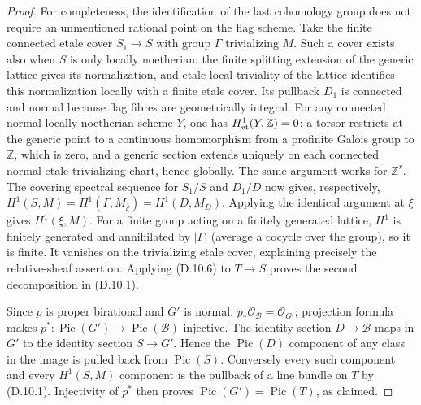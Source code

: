 \begin{proof}
For completeness, the identification of the last cohomology group
does not require an unmentioned rational point on the flag scheme.
Take the finite connected etale cover $S_1\to S$ with group
$\Gamma$ trivializing $M$.  Such a cover exists also when $S$
is only locally noetherian: the finite splitting extension of the
generic lattice gives its normalization, and etale local
triviality of the lattice identifies this normalization locally
with a finite etale cover.  Its pullback $D_1$ is connected and
normal because flag fibres are geometrically integral.  For any
connected normal locally noetherian scheme $Y$, one has
$H^1_{\rm et}(Y,\mathbb Z)=0$: a torsor restricts at the generic
point to a continuous homomorphism from a profinite Galois group to
$\mathbb Z$, which is zero, and a generic section extends uniquely
on each connected normal etale trivializing chart, hence globally.
The same argument works for $\mathbb Z^r$.  The covering spectral
sequence for $S_1/S$ and $D_1/D$ now gives, respectively,
$H^1(S,M)=H^1(\Gamma,M_{\bar\xi})=H^1(D,M_D)$.
Applying the identical argument at $\xi$ gives $H^1(\xi,M)$.
For a finite group acting on a finitely generated lattice, $H^1$
is finitely generated and annihilated by $|\Gamma|$ (average a
cocycle over the group), so it is finite.  It vanishes on the
trivializing etale cover, explaining precisely the relative-sheaf
assertion.  Applying (D.10.6) to $T\to S$ proves the second
decomposition in (D.10.1).

Since $p$ is proper birational and $G'$ is normal, $p_*\mathcal
O_{\mathcal B}=\mathcal O_{G'}$; projection formula makes
$p^*:\operatorname{Pic}(G')\to\operatorname{Pic}(\mathcal B)$
injective.  The identity section $D\to\mathcal B$ maps in $G'$ to
the identity section $S\to G'$.  Hence the $\operatorname{Pic}(D)$
component of any class in the image is pulled back from
$\operatorname{Pic}(S)$.  Conversely every such component and
every $H^1(S,M)$ component is the pullback of a line bundle on $T$
by (D.10.1).  Injectivity of $p^*$ then proves
$\operatorname{Pic}(G')=\operatorname{Pic}(T)$, as claimed.


\end{proof}
